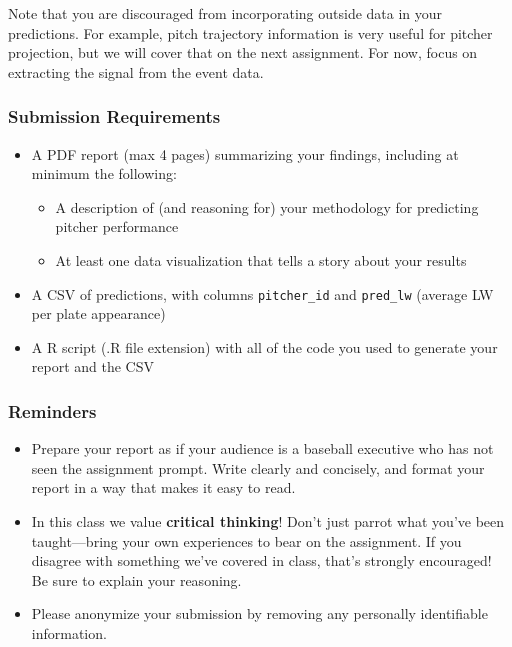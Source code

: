 \documentclass{article}
\begin{document}
      Note that you are discouraged from incorporating outside data in your predictions. For example, pitch trajectory information is very useful for pitcher projection, but we will cover that on the next assignment. For now, focus on extracting the signal from the event data.

      \subsubsection*{\sc Submission Requirements}

        \begin{itemize}
          \item A PDF report (max 4 pages) summarizing your findings, including at minimum the following:
          \begin{itemize}
            \item A description of (and reasoning for) your methodology for predicting pitcher performance
            \item At least one data visualization that tells a story about your results
          \end{itemize}
          \item A CSV of predictions, with columns \texttt{pitcher\_id} and \texttt{pred\_lw} (average LW per plate appearance)
          \item A R script (.R file extension) with all of the code you used to generate your report and the CSV
        \end{itemize}

      \subsubsection*{\sc Reminders}

        \begin{itemize}
          \item Prepare your report as if your audience is a baseball executive who has not seen the assignment prompt. Write clearly and concisely, and format your report in a way that makes it easy to read.
          \item In this class we value {\bf critical thinking}! Don't just parrot what you've been taught---bring your own experiences to bear on the assignment. If you disagree with something we've covered in class, that's strongly encouraged! Be sure to explain your reasoning.
          \item Please anonymize your submission by removing any personally identifiable information.
        \end{itemize}
\end{document}
